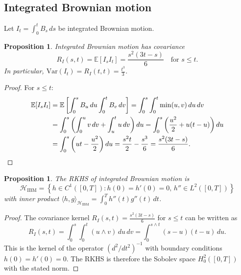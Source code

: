 \documentclass[11pt]{article}
\newtheorem{proposition}[theorem]{Proposition}
\theoremstyle{definition}
\newcommand{\E}{\mathbb{E}}
\newcommand{\Hi}{\mathcal{H}}
\begin{document}
\subsection{Integrated Brownian motion}

Let $I_t = \int_0^t B_s \, ds$ be integrated Brownian motion.

\begin{proposition}\label{prop:ibm-cov}
Integrated Brownian motion has covariance
\begin{equation}
R_I(s,t) = \E[I_s I_t] = \frac{s^2(3t-s)}{6} \quad \text{for } s \leq t.
\end{equation}
In particular, $\mathrm{Var}(I_t) = R_I(t,t) = \frac{t^3}{3}$.
\end{proposition}

\begin{proof}
For $s \leq t$:
\begin{align}
\E[I_s I_t] &= \E\left[\int_0^s B_u\,du \int_0^t B_v\,dv\right] = \int_0^s \int_0^t \min(u,v)\,du\,dv \\
&= \int_0^s \left(\int_0^u v\,dv + \int_u^t u\,dv\right) du = \int_0^s \left(\frac{u^2}{2} + u(t-u)\right) du \\
&= \int_0^s \left(ut - \frac{u^2}{2}\right) du = \frac{s^2 t}{2} - \frac{s^3}{6} = \frac{s^2(3t-s)}{6}. \qedhere
\end{align}
\end{proof}

\begin{proposition}\label{prop:ibm-rkhs}
The RKHS of integrated Brownian motion is
\begin{equation}
\Hi_{\mathrm{IBM}} = \left\{h \in C^1([0,T]) : h(0) = h'(0) = 0,\, h'' \in L^2([0,T])\right\}
\end{equation}
with inner product $\langle h, g \rangle_{\Hi_{\mathrm{IBM}}} = \int_0^T h''(t) g''(t)\,dt$.
\end{proposition}

\begin{proof}
The covariance kernel $R_I(s,t) = \frac{s^2(3t-s)}{6}$ for $s \leq t$ can be written as
\begin{equation}
R_I(s,t) = \int_0^s \int_0^t (u \wedge v)\,du\,dv = \int_0^{s \wedge t} (s-u)(t-u)\,du.
\end{equation}
This is the kernel of the operator $(d^2/dt^2)^{-1}$ with boundary conditions $h(0) = h'(0) = 0$. The RKHS is therefore the Sobolev space $H^2_0([0,T])$ with the stated norm.
\end{proof}
\end{document}

